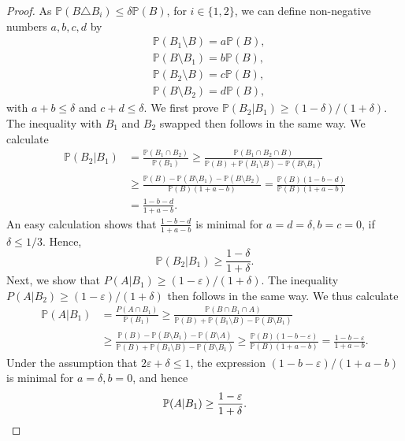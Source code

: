 \documentclass[10pt,a4paper]{amsart}
\renewcommand{\P}{\mathbb{P}}
\renewcommand{\epsilon}{\varepsilon}
\begin{document}
\begin{proof}
	As $\P(B \triangle B_i) \leq \delta \P(B)$, for $i \in \{1,2\}$, we can define non-negative numbers $a,b,c,d$ by 
	\begin{align*}
	&\P(B_1 \setminus B) = a \P(B),	\\
	&\P(B \setminus B_1) = b \P(B),	\\
	&\P(B_2 \setminus B) = c \P(B),	\\
	&\P(B \setminus B_2) = d \P(B),	
	\end{align*}
	with $a+b \leq \delta$ and $c+d \leq \delta$.
	We first prove $\P(B_2|B_1) \geq (1-\delta)/(1+\delta)$.  The inequality with $B_1$ and $B_2$ swapped then follows in the same way. We calculate
	\begin{align*}
		\P(B_2|B_1) &= \frac{\P(B_1\cap B_2)}{\P(B_1)} \geq \frac{\P(B_1\cap B_2 \cap B)}{\P(B)+\P(B_1 \setminus B)- \P(B \setminus B_1)} \\
		&\geq \frac{\P(B) -  \P(B\setminus B_1) -\P(B \setminus B_2)  }{\P(B)(1+a-b)} = \frac{\P(B) (1-b-d) }{\P(B)(1+a-b)} \\
		&= \frac{1-b-d}{1+a-b}.
	\end{align*}
	An easy calculation shows that $\frac{1-b-d}{1+a-b}$ is minimal for $a=d=\delta, b=c=0$, if $\delta \leq 1/3$. Hence,
	$$	\P(B_2|B_1) \geq \frac{1-\delta}{1+\delta}.$$
	Next, we show that $P(A|B_1) \geq (1-\epsilon)/(1+\delta)$. The inequality $P(A|B_2) \geq (1-\epsilon)/(1+\delta)$ then follows in the same way. We thus calculate 
	\begin{align*}
		\P(A|B_1) &= \frac{P(A\cap B_1)}{\P(B_1)} \geq \frac{\P(B \cap B_1 \cap A)}{\P(B) + \P(B_1 \setminus B) - \P(B \setminus B_1)} \\
		&\geq \frac{\P(B)- \P(B \setminus B_1) - \P(B \setminus A)}{\P(B) + \P(B_1 \setminus B) - \P(B \setminus B_1)} \geq \frac{\P(B)(1-b-\epsilon)}{\P(B)(1+a-b)}=\frac{1-b-\epsilon}{1+a-b}.
	\end{align*}
	Under the assumption that $2\epsilon + \delta \leq 1$, the expression $(1-b-\epsilon)/(1+a-b)$ is minimal for $a=\delta,b=0$, and hence
	\[\P(A|B_1) \geq \frac{1-\epsilon}{1+\delta}. \qedhere\]

\end{proof}
\end{document}
